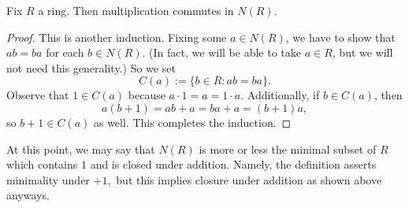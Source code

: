 \documentclass{article}
\begin{document}
\begin{proposition} \label{prop:multcomm}
	Fix $R$ a ring. Then multiplication commutes in $N(R)$.
\end{proposition}
\begin{proof}
	This is another induction. Fixing some $a\in N(R)$, we have to show that $ab=ba$ for each $b\in N(R)$. (In fact, we will be able to take $a\in R$, but we will not need this generality.) So we set
	\[C(a):=\{b\in R:ab=ba\}.\]
	Observe that $1\in C(a)$ because $a\cdot1=a=1\cdot a$. Additionally, if $b\in C(a)$, then
	\[a(b+1)=ab+a=ba+a=(b+1)a,\]
	so $b+1\in C(a)$ as well. This completes the induction.
\end{proof}
At this point, we may say that $N(R)$ is more or less the minimal subset of $R$ which contains $1$ and is closed under addition. Namely, the definition asserts minimality under $+1,$ but this implies closure under addition as shown above anyways.
\end{document}
